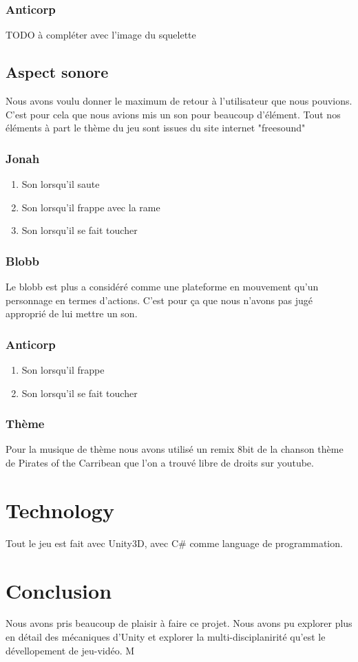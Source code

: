 \documentclass{prologArticle}
\begin{document}
\subsubsection{Anticorp}
TODO à compléter avec l'image du squelette

\subsection{Aspect sonore}
Nous avons voulu donner le maximum de retour à l'utilisateur que nous pouvions. C'est pour cela que nous avions mis un son pour beaucoup d'élément. Tout nos éléments à part le thème du jeu sont issues du site internet "freesound"

\subsubsection{Jonah}
\begin{enumerate}
    \item Son lorsqu'il saute
    \item Son lorsqu'il frappe avec la rame
    \item Son lorsqu'il se fait toucher
\end{enumerate}

\subsubsection{Blobb}
Le blobb est plus a considéré comme une plateforme en mouvement qu'un personnage en termes d'actions. C'est pour ça que nous n'avons pas jugé approprié de lui mettre un son.

\subsubsection{Anticorp}
\begin{enumerate}
    \item Son lorsqu'il frappe
    \item Son lorsqu'il se fait toucher
\end{enumerate}


\subsubsection{Thème}
Pour la musique de thème nous avons utilisé un remix 8bit de la chanson thème de Pirates of the Carribean que l'on a trouvé libre de droits sur youtube.


\section{Technology}
Tout le jeu est fait avec Unity3D, avec C\# comme language de programmation.


\section{Conclusion}
Nous avons pris beaucoup de plaisir à faire ce projet. Nous avons pu explorer plus en détail des mécaniques d'Unity et explorer la multi-disciplanirité qu'est le dévellopement de jeu-vidéo. M
\end{document}
